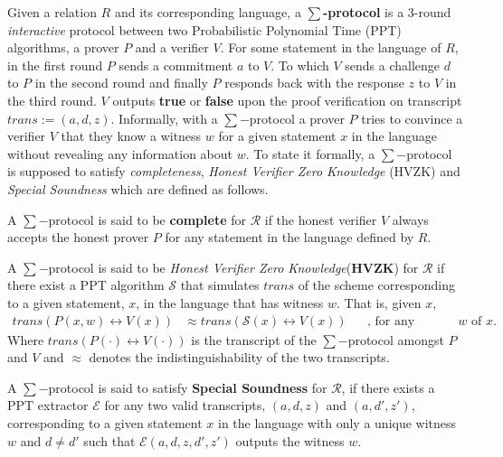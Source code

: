 Given a relation $R$ and its corresponding language, a \textbf{$\sum$-protocol} 
is a $3$-round \textit{interactive} protocol between two Probabilistic Polynomial Time (PPT) algorithms, 
a prover $P$ 
and a verifier $V$. For some statement in the language of $R$, in the first round $P$ sends a 
commitment $a$ to $V$. To which $V$ sends a challenge $d$ to $P$ in the second round 
and finally $P$ responds back with the response $z$ to $V$ in the third round. 
$V$ outputs \textbf{true} or \textbf{false} upon the proof verification on transcript
$trans := (a, d, z)$. 
Informally, with a $\sum-$protocol a prover $P$ tries to convince
a verifier $V$ that they know a witness $w$ for a given statement $x$ in the language without 
revealing any information about $w$. To state it formally, a $\sum-$protocol is 
supposed to satisfy \textit{completeness}, \textit{Honest Verifier Zero Knowledge} (HVZK)
and \textit{Special Soundness} which are defined as follows.

\begin{definition}[Completeness]
  A $\sum-$protocol is said to be \textbf{complete} for $\mathcal{R}$ if
  the honest verifier $V$ always accepts the honest prover $P$ for any statement in the language 
  defined by $R$.
\end{definition}

\begin{definition}[HVZK]
  A $\sum-$protocol is said to be \textit{Honest Verifier Zero Knowledge}(\textbf{HVZK}) for $\mathcal{R}$ if there exist a PPT algorithm $\mathcal{S}$ 
  that simulates $trans$ of the scheme corresponding to a given statement, $x$, in the 
  language that has witness $w$. 
  That is, given $x$,
  \begin{align*}
    trans(P(x,w)\leftrightarrow V(x)) &\approx trans(\mathcal{S}(x) \leftrightarrow V(x))&& \text{, for any witness $w$ of $x$.}
  \end{align*}
  Where $trans(P(\cdot)\leftrightarrow V(\cdot))$ is the transcript of the $\sum-$protocol amongst 
  $P$ and $V$ and $\approx$ denotes the indistinguishability of the two transcripts.
\end{definition}

\begin{definition}
  A $\sum-$protocol is said to satisfy \textbf{Special Soundness} for $\mathcal{R}$, 
  if there exists a PPT extractor $\mathcal{E}$ for any two valid transcripts, $(a,d,z)$ and 
  $(a,d',z')$, corresponding to a given statement $x$ in the language with only a unique 
  witness $w$ and $d\neq d'$ such that $\mathcal{E}(a,d,z,d',z')$ outputs the witness $w$. 
\end{definition}

